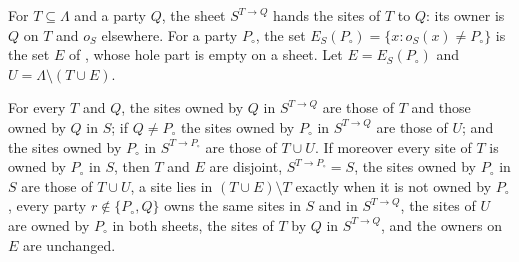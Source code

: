 \begin{definition}
    \label{def:party_change_owner}
    \leanok
    For $T\subseteq\Lambda$ and a party $Q$, the sheet $S^{T\to Q}$ hands the sites of $T$ to
    $Q$: its owner is $Q$ on $T$ and $o_S$ elsewhere. For a party $P_\circ$, the set
    $E_S(P_\circ)=\{x:o_S(x)\neq P_\circ\}$ is the set $E$ of
    \cite[Lemma~6.5]{OpenAI2026PolynomialPEPS}, whose hole part is empty on a sheet. Let
    $E=E_S(P_\circ)$ and $U=\Lambda\setminus(T\cup E)$.

    For every $T$ and $Q$, the sites owned by $Q$ in $S^{T\to Q}$ are those of $T$ and those
    owned by $Q$ in $S$; if $Q\neq P_\circ$ the sites owned by $P_\circ$ in $S^{T\to Q}$ are
    those of $U$; and the sites owned by $P_\circ$ in $S^{T\to P_\circ}$ are those of
    $T\cup U$. If moreover every site of $T$ is owned by $P_\circ$ in $S$, then $T$ and $E$ are
    disjoint, $S^{T\to P_\circ}=S$, the sites owned by $P_\circ$ in $S$ are those of $T\cup U$,
    a site lies in $(T\cup E)\setminus T$ exactly when it is not owned by $P_\circ$, every
    party $r\notin\{P_\circ,Q\}$ owns the same sites in $S$ and in $S^{T\to Q}$, the sites of
    $U$ are owned by $P_\circ$ in both sheets, the sites of $T$ by $Q$ in $S^{T\to Q}$, and the
    owners on $E$ are unchanged.
\end{definition}

